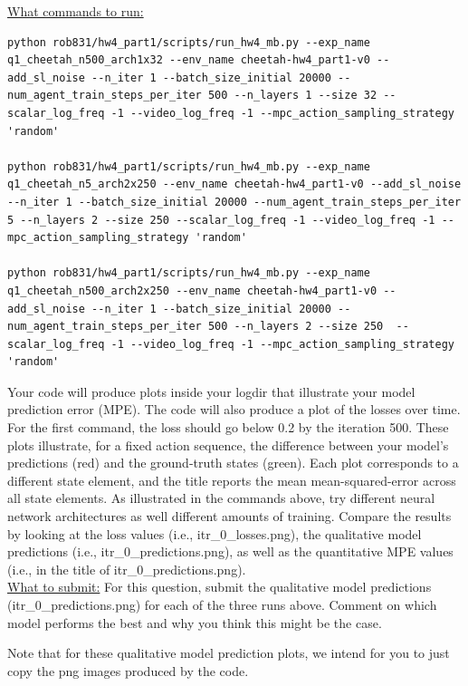 \documentclass{article} %
\begin{document}
\underline{What commands to run:}
\begin{lstlisting}[escapechar=@]
python rob831/hw4_part1/scripts/run_hw4_mb.py --exp_name q1_cheetah_n500_arch1x32 --env_name cheetah-hw4_part1-v0 --add_sl_noise --n_iter 1 --batch_size_initial 20000 --num_agent_train_steps_per_iter 500 --n_layers 1 --size 32 --scalar_log_freq -1 --video_log_freq -1 --mpc_action_sampling_strategy 'random'

python rob831/hw4_part1/scripts/run_hw4_mb.py --exp_name q1_cheetah_n5_arch2x250 --env_name cheetah-hw4_part1-v0 --add_sl_noise --n_iter 1 --batch_size_initial 20000 --num_agent_train_steps_per_iter 5 --n_layers 2 --size 250 --scalar_log_freq -1 --video_log_freq -1 --mpc_action_sampling_strategy 'random'

python rob831/hw4_part1/scripts/run_hw4_mb.py --exp_name q1_cheetah_n500_arch2x250 --env_name cheetah-hw4_part1-v0 --add_sl_noise --n_iter 1 --batch_size_initial 20000 --num_agent_train_steps_per_iter 500 --n_layers 2 --size 250  --scalar_log_freq -1 --video_log_freq -1 --mpc_action_sampling_strategy 'random'
\end{lstlisting}

Your code will produce plots inside your logdir that illustrate your model prediction error (MPE). The code will also produce a plot of the losses over time. For the first command, the loss should go below 0.2 by the iteration 500. These plots illustrate, for a fixed action sequence, the difference between your model's predictions (red) and the ground-truth states (green). Each plot corresponds to a different state element, and the title reports the mean mean-squared-error across all state elements. As illustrated in the commands above, try different neural network architectures as well different amounts of training. Compare the results by looking at the loss values (i.e., itr\_0\_losses.png), the qualitative model predictions (i.e., itr\_0\_predictions.png), as well as the quantitative MPE values (i.e., in the title of itr\_0\_predictions.png).\\

\underline{What to submit:} For this question, submit the qualitative model predictions (itr\_0\_predictions.png) for each of the three runs above. Comment on which model performs the best and why you think this might be the case.

Note that for these qualitative model prediction plots, we intend for you to just copy the png images produced by the code.


\newpage
\end{document}
